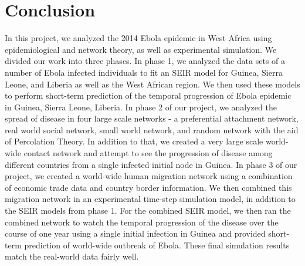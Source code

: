 \documentclass[10pt, journal,onecolumn]{IEEEtran}
\begin{document}
\section{Conclusion} In this project, we analyzed the 2014 Ebola epidemic in West Africa using
epidemiological and network theory, as well as experimental simulation.
We divided our work into three phases. In phase 1, we analyzed
the data sets of a number of Ebola infected individuals to fit an SEIR model for Guinea, Sierra Leone, and
Liberia as well as the West African region. We then used these models to perform short-term
prediction of the temporal progression of Ebola epidemic in Guinea, Sierra Leone, Liberia. In phase 2
of our project, we analyzed the spread of disease in four large scale networks - a  preferential
attachment network, real world social network, small world network, and random network with the aid
of Percolation Theory. In addition to that, we created a very large scale world-wide contact network
and attempt to see the progression of disease among different countries from a single infected
initial node in Guinea. In phase 3 of our project, we created a world-wide human migration network
using a combination of economic trade data and country border information. We then combined this
migration network in an experimental time-step simulation model, in addition to the SEIR models from phase 1.
For the combined SEIR model, we then ran the combined network to watch the
temporal progression of the disease over the course of one year using a single initial infection in
Guinea and provided short-term prediction of world-wide outbreak of Ebola. These final simulation results
match the real-world data fairly well.








\end{document}

